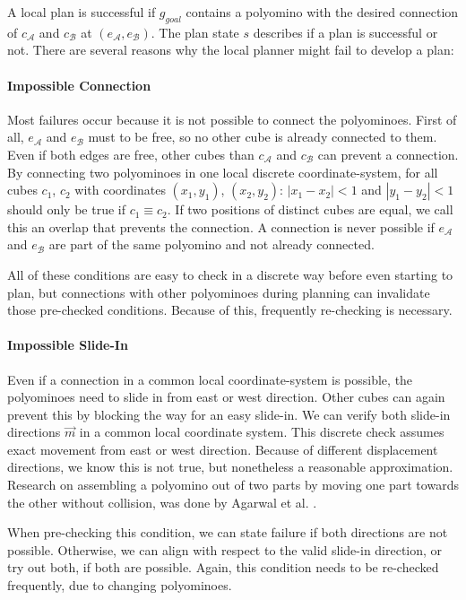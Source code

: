 A local plan is successful if $g_\textit{goal}$ contains a polyomino with the desired connection of $c_\mathcal{A}$ and $c_\mathcal{B}$ at $(e_\mathcal{A}, e_\mathcal{B})$.
The plan state $s$ describes if a plan is successful or not.
There are several reasons why the local planner might fail to develop a plan:

\paragraph{Impossible Connection}

Most failures occur because it is not possible to connect the polyominoes.
First of all, $e_\mathcal{A}$ and $e_\mathcal{B}$ must to be free, so no other cube is already connected to them.
Even if both edges are free, other cubes than $c_\mathcal{A}$ and $c_\mathcal{B}$ can prevent a connection.
By connecting two polyominoes in one local discrete coordinate-system, for all cubes $c_1$, $c_2$ with coordinates $(x_1, y_1)$, $(x_2, y_2)$: $\left|x_1 - x_2\right| < 1$ and $\left|y_1 - y_2\right| < 1$ should only be true if $c_1 \equiv c_2$.
If two positions of distinct cubes are equal, we call this an overlap that prevents the connection.
A connection is never possible if $e_\mathcal{A}$ and $e_\mathcal{B}$ are part of the same polyomino and not already connected.

All of these conditions are easy to check in a discrete way before even starting to plan, but connections with other polyominoes during planning can invalidate those pre-checked conditions.
Because of this, frequently re-checking is necessary.

\paragraph{Impossible Slide-In}

Even if a connection in a common local coordinate-system is possible, the polyominoes need to slide in from east or west direction.
Other cubes can again prevent this by blocking the way for an easy slide-in.
We can verify both slide-in directions $\vec{m}$ in a common local coordinate system.
This discrete check assumes exact movement from east or west direction.
Because of different displacement directions, we know this is not true, but nonetheless a reasonable approximation.
Research on assembling a polyomino out of two parts by moving one part towards the other without collision, was done by Agarwal et al. \cite{agarwal2021}. 

When pre-checking this condition, we can state failure if both directions are not possible.
Otherwise, we can align with respect to the valid slide-in direction, or try out both, if both are possible.
Again, this condition needs to be re-checked frequently, due to changing polyominoes.

